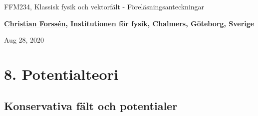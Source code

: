 \documentclass[%
oneside,                 %
final,                   %
10pt]{article}
\begin{document}

\newcommand{\exercisesection}[1]{\subsection*{#1}}







\thispagestyle{empty}

\begin{center}
{\LARGE\bf
\begin{spacing}{1.25}
FFM234, Klassisk fysik och vektorfält - Föreläsningsanteckningar
\end{spacing}
}
\end{center}


\begin{center}
{\bf \href{{http://fy.chalmers.se/subatom/tsp/}}{Christian Forssén}, Institutionen för fysik, Chalmers, Göteborg, Sverige${}^{}$} \\ [0mm]
\end{center}

\begin{center}
\end{center}
    

\begin{center}
Aug 28, 2020
\end{center}

\vspace{1cm}


\section*{8. Potentialteori}

\subsection*{Konservativa fält och potentialer}
\end{document}
